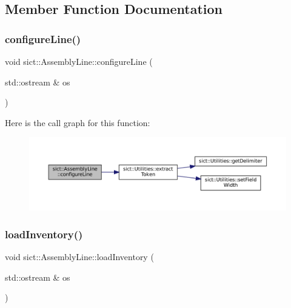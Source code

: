 \subsection{Member Function Documentation}
\mbox{\label{classsict_1_1AssemblyLine_aa5df8cd3a319d7d1cb81ced7982d406f}} 
\subsubsection{\texorpdfstring{configureLine()}{configureLine()}}
{\footnotesize\ttfamily void sict\+::\+Assembly\+Line\+::configure\+Line (\begin{DoxyParamCaption}\item[{std\+::ostream \&}]{os }\end{DoxyParamCaption})}

Here is the call graph for this function\+:
\nopagebreak
\begin{figure}[H]
\begin{center}
\leavevmode
\includegraphics[width=350pt]{classsict_1_1AssemblyLine_aa5df8cd3a319d7d1cb81ced7982d406f_cgraph}
\end{center}
\end{figure}
\mbox{\label{classsict_1_1AssemblyLine_a6262c74cb2d0a5c47cec2552596d8682}} 
\subsubsection{\texorpdfstring{loadInventory()}{loadInventory()}}
{\footnotesize\ttfamily void sict\+::\+Assembly\+Line\+::load\+Inventory (\begin{DoxyParamCaption}\item[{std\+::ostream \&}]{os }\end{DoxyParamCaption})}

